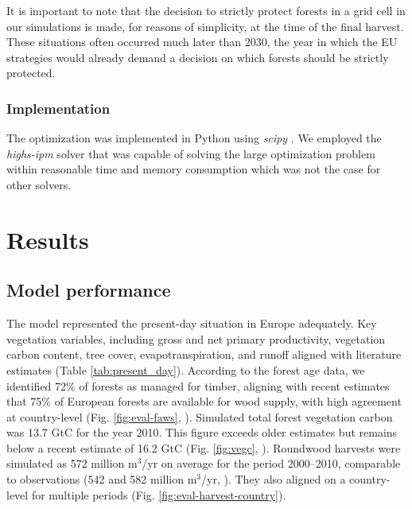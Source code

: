 \documentclass[]{article}
\begin{document}
\noindent It is important to note that the decision to strictly protect forests in a grid cell in our simulations is made, for reasons of simplicity, at the time of the final harvest. These situations often occurred much later than 2030, the year in which the EU strategies would already demand a decision on which forests should be strictly protected.

\subsubsection{Implementation}
The optimization was implemented in Python using \textit{scipy} \parencite{Virtanen2020}. We employed the \textit{highs-ipm} solver \parencite{HUANGFU2018} that was capable of solving the large optimization problem within reasonable time and memory consumption which was not the case for other solvers.






\section{Results}

\glsresetall

\subsection{Model performance}

The model represented the present-day situation in Europe adequately. Key vegetation variables, including gross and net primary productivity, vegetation carbon content, tree cover, evapotranspiration, and runoff aligned with literature estimates (Table \ref{tab:present_day}).
According to the forest age data, we identified 72\% of forests as managed for timber, aligning with recent estimates that 75\% of European forests are available for wood supply, with high agreement at country-level (Fig. \ref{fig:eval-faws}, \textcite{FORESTEUROPE2020}).
Simulated total forest vegetation carbon was 13.7 GtC for the year 2010. This figure exceeds older estimates \parencite[11.6--13 GtC,][]{Pan2011, ForestEurope2015, Liu2015} but remains below a recent estimate of 16.2 GtC (Fig. \ref{fig:vegc}, \textcite{Santoro2021}).
Roundwood harvests were simulated as 572 million m$^3$/yr on average for the period 2000--2010, comparable to observations (542 and 582 million m$^3$/yr, \textcite{ForestEurope2015, FORESTEUROPE2020}). They also aligned on a country-level for multiple periods (Fig. \ref{fig:eval-harvest-country}).
\end{document}
